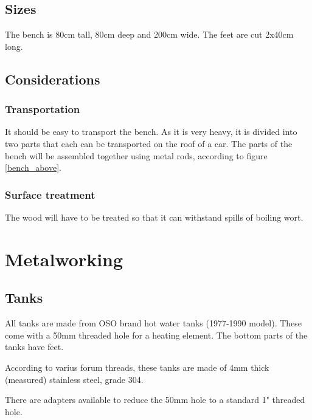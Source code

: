 \documentclass[11pt,fleqn,openany]{book} %
\begin{document}
\section{Sizes}

The bench is 80cm tall, 80cm deep and 200cm wide. The feet are cut 2x40cm long.

\section{Considerations}

\subsection{Transportation}

It should be easy to transport the bench. As it is very heavy, it is divided into two parts that each can be transported on the roof of a car. The parts of the bench will be assembled together using metal rods, according to figure \ref{bench_above}.

\subsection{Surface treatment}

The wood will have to be treated so that it can withstand spills of boiling wort.



\chapter{Metalworking}

\section{Tanks}

All tanks are made from OSO brand hot water tanks (1977-1990 model). These come with a 50mm threaded hole for a heating element. The bottom parts of the tanks have feet.

According to varius forum threads, these tanks are made of 4mm thick (measured) stainless steel, grade 304.

There are adapters available to reduce the 50mm hole to a standard 1" threaded hole.\\
\end{document}
